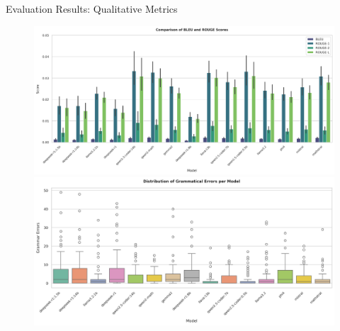 \documentclass{beamer}
\begin{document}
\begin{frame}{Evaluation Results: Qualitative Metrics}
  \begin{figure}
    \centering
    \begin{minipage}{0.45\textwidth}
      \centering
      \includegraphics[width=\textwidth]{bleu_rouge.png}
    \end{minipage}
    \hfill
    \begin{minipage}{0.45\textwidth}
      \centering
      \includegraphics[width=\textwidth]{grammar_errors.png}
    \end{minipage}
    
    \vspace{0.15cm}
    

\end{figure}
\end{frame}
\end{document}
